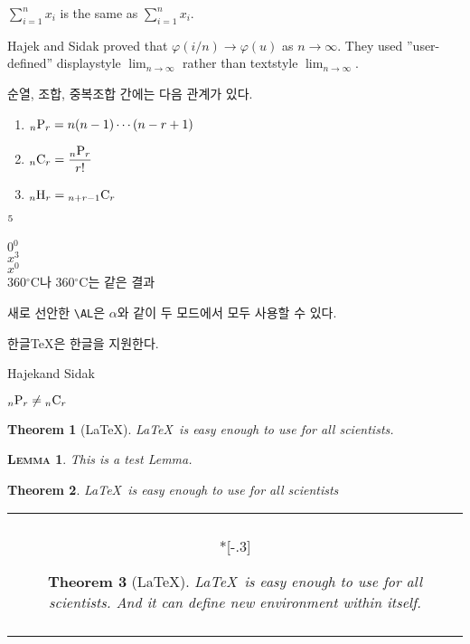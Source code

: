 \documentclass[11pt]{article}
\makeatletter
\newcommand{\dsum}[2]{\displaystyle \sum_{#1}^{#2}}
\newcommand{\vphi}{\varphi}
\newcommand{\go}{\longrightarrow}
\newcommand{\Hajek}{Hajek}
\newcommand{\Sidak}{Sidak}
\newcommand{\dlim}[1]{{\displaystyle \lim_{#1}}}
\newcommand{\harcombi}[2]{{}_{#1}{\rm H}_{#2}}
\newcommand{\permut}[2]{{}_{#1}{\rm P}_{#2}}
\newcommand{\combi}[2]{{}_{#1}{\rm C}_{#2}}
\newcommand{\tmp}[1][0]{$\mathrm{R}^{#1}$}
\renewcommand{\tmp}[2][0]{$#2^#1$}
\providecommand{\mdegree}[1]{#1\ensuremath{^\circ}}
\newcommand{\AL}{\ensuremath{\alpha}}
\newcommand{\htex}{\mbox{한글\TeX}}
\newcommand{\HandS}{\Hajek and \Sidak}
\newcommand{\pandc}[2]{\permut{#1}{#2} \ne \combi{#1}{#2}}
\newtheorem{theorem}{Theorem}[section]
\newtheorem{la}{\scshape Lemma}[section]
\newenvironment{mytheorem}{\begin{theorem} \normalfont}{\end{theorem}}
\newenvironment{myfbox}[1][\textwidth]%
{\begin{tabular}{|@{\hspace{1em}}c@{\hspace{1em}}|}%
\hline \\*[-.3\baselineskip]
\begin{minipage}[t]{#1}}%
{\end{minipage} \\ \vspace{-.3\baselineskip} \\
\hline \end{tabular}}
\makeatother
\begin{document}
$\dsum{i=1}{n} x_i$ is the same as $\sum_{i=1}^n x_i$.

Hajek and Sidak proved that $\vphi (i/n)\go \vphi(u)$ as $n\go\infty$. They used  ''user-defined'' displaystyle $\dlim{n\go\infty}$ rather than textstyle $\lim_{n\go\infty}$.

순열, 조합, 중복조합 간에는 다음 관계가 있다.
\begin{enumerate}
\item $\permut{n}{r}=n(n-1)\cdots(n-r+1)$
\item $\combi{n}{r}={\displaystyle \frac{\permut{n}{r}}{r!}}$
\item $\harcombi{n}{r}=\combi{n+r-1}{r}$
\end{enumerate}

\tmp[5] \\

\tmp{0} \\

\tmp[3]{x} \\

\tmp{x}  \\

\mdegree{360}C나 $\mdegree{360}$C는 같은 결과

새로 선안한 \verb+\AL+은  $\AL$와 같이 두 모드에서 모두 사용할 수 있다.

\htex 은 한글을 지원한다.

\HandS

$\pandc{n}{r}$

\begin{theorem}[\LaTeX] \label{th:texusage}
\LaTeX\ is easy enough to use for all scientists.
\end{theorem}

\begin{la}
This is a test Lemma.
\end{la}

\begin{mytheorem}[\LaTeX]
\LaTeX\ is easy enough to use for all scientists
\end{mytheorem}

\begin{myfbox}%
\vspace*{-1.5\baselineskip}
\begin{theorem}[\LaTeX] \label{th:texsage2}
\LaTeX\ is easy enough to use for all scientists. And it can define new environment within itself.
\end{theorem}
\vspace*{-1.5\baselineskip}
\end{myfbox}
\end{document}
